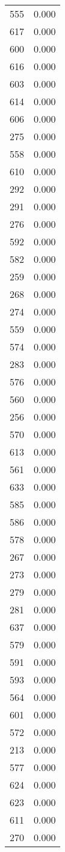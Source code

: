 \begin{table}
\begin{tabular}{lr}
555 & 0.000 \\
617 & 0.000 \\
600 & 0.000 \\
616 & 0.000 \\
603 & 0.000 \\
614 & 0.000 \\
606 & 0.000 \\
275 & 0.000 \\
558 & 0.000 \\
610 & 0.000 \\
292 & 0.000 \\
291 & 0.000 \\
276 & 0.000 \\
592 & 0.000 \\
582 & 0.000 \\
259 & 0.000 \\
268 & 0.000 \\
274 & 0.000 \\
559 & 0.000 \\
574 & 0.000 \\
283 & 0.000 \\
576 & 0.000 \\
560 & 0.000 \\
256 & 0.000 \\
570 & 0.000 \\
613 & 0.000 \\
561 & 0.000 \\
633 & 0.000 \\
585 & 0.000 \\
586 & 0.000 \\
578 & 0.000 \\
267 & 0.000 \\
273 & 0.000 \\
279 & 0.000 \\
281 & 0.000 \\
637 & 0.000 \\
579 & 0.000 \\
591 & 0.000 \\
593 & 0.000 \\
564 & 0.000 \\
601 & 0.000 \\
572 & 0.000 \\
213 & 0.000 \\
577 & 0.000 \\
624 & 0.000 \\
623 & 0.000 \\
611 & 0.000 \\
270 & 0.000 \\

\end{tabular}
\end{table}
